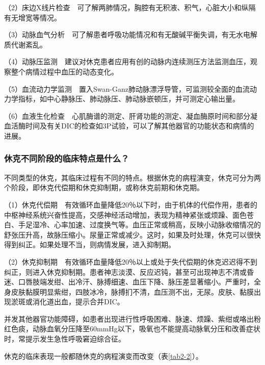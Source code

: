 （2）床边X线片检查　可了解两肺情况，胸腔有无积液、积气，心脏大小和纵隔有无增宽等情况。

（3）动脉血气分析　可了解患者呼吸功能情况和有无酸碱平衡失调，有无水电解质代谢紊乱。

（4）动脉压监测　建议对休克患者应用有创的动脉内连续测压方法监测血压，观察整个病情过程中血压的动态变化。

（5）血流动力学监测　置入Swan-Ganz肺动脉漂浮导管，可监测较全面的血流动力学指标，如中心静脉压、肺动脉压、肺动脉嵌顿压，并可测定心输出量。

（6）血液生化检查　心肌酶谱的测定、肝肾功能的测定、凝血酶原时间和部分凝血活酶时间及有关DIC的检查如3P试验，可以了解其他器官的功能状态和病情的进展。

\subsubsection{休克不同阶段的临床特点是什么？}

不同类型的休克，其临床过程有不同的特点。根据休克的病程演变，休克可分为两个阶段，即休克代偿期和休克抑制期，或称休克前期和休克期。

（1）休克代偿期　有效循环血量降低20％以下时，由于机体的代偿作用，患者的中枢神经系统兴奋性提高，交感神经活动增加，表现为精神紧张或烦躁、面色苍白、手足湿冷、心率加速、过度换气等。血压正常或稍高，反映小动脉收缩情况的舒张压升高，故脉压缩小。尿量正常或减少。这时，如果及时处理，休克可以很快得到纠正。如果处理不当，则病情发展，进入抑制期。

（2）休克抑制期　有效循环血量降低20％以上或处于失代偿期的休克迟迟得不到纠正，则进入休克抑制期。患者神志淡漠、反应迟钝，甚至可出现神志不清或昏迷、口唇肢端发绀、出冷汗、脉搏细速、血压下降、脉压差显著缩小。严重时，全身皮肤黏膜明显紫绀，四肢冰冷，脉搏扪不清，血压测不出，无尿。皮肤、黏膜出现淤斑或消化道出血，提示合并DIC。

并发其他器官功能障碍，如患者出现进行性呼吸困难、脉速、烦躁、紫绀或咯出粉红色痰，动脉血氧分压降至60mmHg以下，吸氧也不能提高动脉氧分压和改善症状时，常提示发生急性呼吸窘迫综合征。

休克的临床表现一般都随休克的病程演变而改变（表\ref{tab2-2}）。

